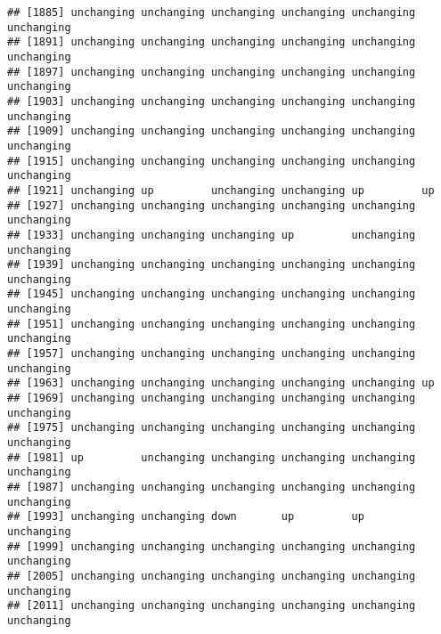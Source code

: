 \documentclass[]{article}
\begin{document}
\begin{verbatim}
## [1885] unchanging unchanging unchanging unchanging unchanging unchanging
## [1891] unchanging unchanging unchanging unchanging unchanging unchanging
## [1897] unchanging unchanging unchanging unchanging unchanging unchanging
## [1903] unchanging unchanging unchanging unchanging unchanging unchanging
## [1909] unchanging unchanging unchanging unchanging unchanging unchanging
## [1915] unchanging unchanging unchanging unchanging unchanging unchanging
## [1921] unchanging up         unchanging unchanging up         up        
## [1927] unchanging unchanging unchanging unchanging unchanging unchanging
## [1933] unchanging unchanging unchanging up         unchanging unchanging
## [1939] unchanging unchanging unchanging unchanging unchanging unchanging
## [1945] unchanging unchanging unchanging unchanging unchanging unchanging
## [1951] unchanging unchanging unchanging unchanging unchanging unchanging
## [1957] unchanging unchanging unchanging unchanging unchanging unchanging
## [1963] unchanging unchanging unchanging unchanging unchanging up        
## [1969] unchanging unchanging unchanging unchanging unchanging unchanging
## [1975] unchanging unchanging unchanging unchanging unchanging unchanging
## [1981] up         unchanging unchanging unchanging unchanging unchanging
## [1987] unchanging unchanging unchanging unchanging unchanging unchanging
## [1993] unchanging unchanging down       up         up         unchanging
## [1999] unchanging unchanging unchanging unchanging unchanging unchanging
## [2005] unchanging unchanging unchanging unchanging unchanging unchanging
## [2011] unchanging unchanging unchanging unchanging unchanging unchanging
## [2017] unchanging unchanging unchanging unchanging unchanging unchanging
## [2023] unchanging unchanging unchanging unchanging unchanging unchanging
## [2029] unchanging unchanging unchanging unchanging unchanging unchanging
## [2035] unchanging unchanging unchanging unchanging unchanging unchanging
## [2041] unchanging unchanging unchanging unchanging unchanging unchanging
## [2047] unchanging unchanging unchanging unchanging unchanging unchanging
## [2053] unchanging unchanging unchanging unchanging unchanging unchanging
## [2059] unchanging unchanging unchanging unchanging unchanging unchanging
## [2065] unchanging unchanging unchanging unchanging unchanging unchanging
## [2071] unchanging unchanging unchanging unchanging unchanging unchanging
## [2077] unchanging unchanging unchanging unchanging unchanging unchanging
## [2083] unchanging unchanging unchanging up         unchanging unchanging
## [2089] unchanging unchanging unchanging unchanging unchanging unchanging

\end{verbatim}
\end{document}
